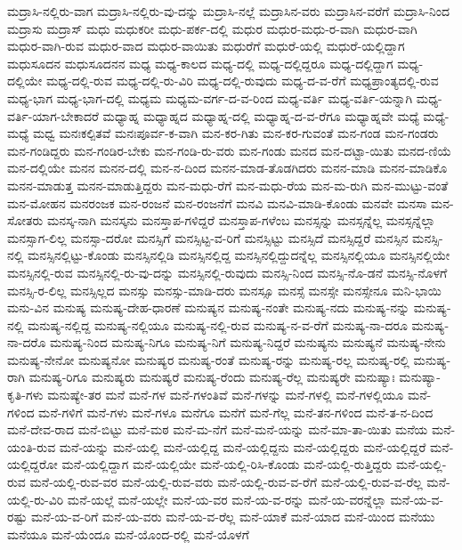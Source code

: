 {ಮದ್ರಾಸಿ-ನಲ್ಲಿರು-ವಾಗ
ಮದ್ರಾಸಿ-ನಲ್ಲಿರು-ವು-ದನ್ನು
ಮದ್ರಾಸಿ-ನಲ್ಲೆ
ಮದ್ರಾಸಿನ-ವರು
ಮದ್ರಾಸಿನ-ವರೆಗೆ
ಮದ್ರಾಸಿ-ನಿಂದ
ಮದ್ರಾಸು
ಮದ್ರಾಸ್
ಮಧು
ಮಧುಕರೀ
ಮಧು-ಪರ್ಕ-ದಲ್ಲಿ
ಮಧುರ
ಮಧುರ-ಮಧು-ರ-ವಾಗಿ
ಮಧುರ-ವಾಗಿ
ಮಧುರ-ವಾಗಿ-ರುವ
ಮಧುರ-ವಾದ
ಮಧುರ-ವಾಯಿತು
ಮಧುರೆಗೆ
ಮಧುರೆ-ಯಲ್ಲಿ
ಮಧುರೆ-ಯಲ್ಲಿದ್ದಾಗ
ಮಧುಸೂದನ
ಮಧುಸೂದನನ
ಮಧ್ಯ
ಮಧ್ಯ-ಕಾಲದ
ಮಧ್ಯ-ದಲ್ಲಿ
ಮಧ್ಯ-ದಲ್ಲಿದ್ದರೂ
ಮಧ್ಯ-ದಲ್ಲಿದ್ದಾಗ
ಮಧ್ಯ-ದಲ್ಲಿಯೇ
ಮಧ್ಯ-ದಲ್ಲಿ-ರುವ
ಮಧ್ಯ-ದಲ್ಲಿ-ರು-ವಿರಿ
ಮಧ್ಯ-ದಲ್ಲಿ-ರುವುದು
ಮಧ್ಯ-ದ-ವ-ರೆಗೆ
ಮಧ್ಯಪ್ರಾಂತ್ಯದಲ್ಲಿ-ರುವ
ಮಧ್ಯ-ಭಾಗ
ಮಧ್ಯ-ಭಾಗ-ದಲ್ಲಿ
ಮಧ್ಯಮ
ಮಧ್ಯಮ-ವರ್ಗ-ದ-ವ-ರಿಂದ
ಮಧ್ಯ-ವರ್ತಿ
ಮಧ್ಯ-ವರ್ತಿ-ಯನ್ನಾಗಿ
ಮಧ್ಯ-ವರ್ತಿ-ಯಾಗ-ಬೇಕಾದರೆ
ಮಧ್ಯಾಹ್ನ
ಮಧ್ಯಾಹ್ನದ
ಮಧ್ಯಾಹ್ನ-ದಲ್ಲಿ
ಮಧ್ಯಾಹ್ನ-ದ-ವ-ರೆಗೂ
ಮಧ್ಯಾಹ್ನವೇ
ಮಧ್ಯೆ
ಮಧ್ಯೆ-ಮಧ್ಯೆ
ಮಧ್ವ
ಮನಃಕಲ್ಪಿತವೆ
ಮನಃಪೂರ್ವ-ಕ-ವಾಗಿ
ಮನ-ಕರ-ಗಿತು
ಮನ-ಕರ-ಗುವಂತೆ
ಮನ-ಗಂಡ
ಮನ-ಗಂಡರು
ಮನ-ಗಂಡಿದ್ದರು
ಮನ-ಗಂಡಿರ-ಬೇಕು
ಮನ-ಗಂಡಿ-ರು-ವರು
ಮನ-ಗಂಡು
ಮನದ
ಮನ-ದಟ್ಟಾ-ಯಿತು
ಮನದ-ಣಿಯೆ
ಮನ-ದಲ್ಲಿಯೇ
ಮನನ
ಮನನ-ದಲ್ಲಿ
ಮನ-ನ-ದಿಂದ
ಮನನ-ಮಾಡ-ತೊಡಗಿದರು
ಮನನ-ಮಾಡಿ
ಮನನ-ಮಾಡಿಕೊ
ಮನನ-ಮಾಡುತ್ತ
ಮನನ-ಮಾಡುತ್ತಿದ್ದರು
ಮನ-ಮಧು-ರೆಗೆ
ಮನ-ಮಧು-ರೆಯ
ಮನ-ಮ-ರುಗಿ
ಮನ-ಮುಟ್ಟು-ವಂತೆ
ಮನ-ಮೋಹನ
ಮನರಂಜಕ
ಮನ-ರಂಜನೆ
ಮನ-ರಂಜನೆಗೆ
ಮನವಿ
ಮನವಿ-ಮಾಡಿ-ಕೊಂಡು
ಮನವೇ
ಮನಸಾ
ಮನ-ಸೋತರು
ಮನಸ್ಕ-ನಾಗಿ
ಮನಸ್ಕನು
ಮನಸ್ತಾಪ-ಗಳಿದ್ದರೆ
ಮನಸ್ತಾಪ-ಗಳೆಂಬ
ಮನಸ್ಸನ್ನು
ಮನಸ್ಸನ್ನೆಲ್ಲ
ಮನಸ್ಸನ್ನೆಲ್ಲಾ
ಮನಸ್ಸಾಗ-ಲಿಲ್ಲ
ಮನಸ್ಸಾ-ದರೋ
ಮನಸ್ಸಿಗೆ
ಮನಸ್ಸಿಟ್ಟ-ವ-ರಿಗೆ
ಮನಸ್ಸಿಟ್ಟು
ಮನಸ್ಸಿದೆ
ಮನಸ್ಸಿದ್ದರೆ
ಮನಸ್ಸಿನ
ಮನಸ್ಸಿ-ನಲ್ಲಿ
ಮನಸ್ಸಿನಲ್ಲಿಟ್ಟು-ಕೊಂಡು
ಮನಸ್ಸಿನಲ್ಲಿಡಿ
ಮನಸ್ಸಿನಲ್ಲಿದ್ದ
ಮನಸ್ಸಿನಲ್ಲಿದ್ದುದನ್ನೆಲ್ಲ
ಮನಸ್ಸಿನಲ್ಲಿಯೂ
ಮನಸ್ಸಿನಲ್ಲಿಯೇ
ಮನಸ್ಸಿನಲ್ಲಿ-ರುವ
ಮನಸ್ಸಿನಲ್ಲಿ-ರು-ವು-ದನ್ನು
ಮನಸ್ಸಿನಲ್ಲಿ-ರುವುದು
ಮನಸ್ಸಿ-ನಿಂದ
ಮನಸ್ಸಿ-ನೊ-ಡನೆ
ಮನಸ್ಸಿ-ನೊಳಗೆ
ಮನಸ್ಸಿ-ರ-ಲಿಲ್ಲ
ಮನಸ್ಸಿಲ್ಲದ
ಮನಸ್ಸು
ಮನಸ್ಸು-ಮಾಡಿ-ದರು
ಮನಸ್ಸೂ
ಮನಸ್ಸೆ
ಮನಸ್ಸೇ
ಮನಸ್ಸೇನೂ
ಮನಿ-ಭಾಯಿ
ಮನು-ವಿನ
ಮನುಷ್ಯ
ಮನುಷ್ಯ-ದೇಹ-ಧಾರಣೆ
ಮನುಷ್ಯನ
ಮನುಷ್ಯ-ನಂತೇ
ಮನುಷ್ಯ-ನದು
ಮನುಷ್ಯ-ನನ್ನು
ಮನುಷ್ಯ-ನಲ್ಲಿ
ಮನುಷ್ಯ-ನಲ್ಲಿದ್ದ
ಮನುಷ್ಯ-ನಲ್ಲಿಯೂ
ಮನುಷ್ಯ-ನಲ್ಲಿ-ರುವ
ಮನುಷ್ಯ-ನ-ವ-ರೆಗೆ
ಮನುಷ್ಯ-ನಾ-ದರೂ
ಮನುಷ್ಯ-ನಾ-ದರೊ
ಮನುಷ್ಯ-ನಿಂದ
ಮನುಷ್ಯ-ನಿಗೂ
ಮನುಷ್ಯ-ನಿಗೆ
ಮನುಷ್ಯ-ನಿದ್ದರೆ
ಮನುಷ್ಯನು
ಮನುಷ್ಯನೆ
ಮನುಷ್ಯ-ನೇನು
ಮನುಷ್ಯ-ನೇನೋ
ಮನುಷ್ಯನೋ
ಮನುಷ್ಯರ
ಮನುಷ್ಯ-ರಂತೆ
ಮನುಷ್ಯ-ರನ್ನು
ಮನುಷ್ಯ-ರಲ್ಲ
ಮನುಷ್ಯ-ರಲ್ಲಿ
ಮನುಷ್ಯ-ರಾಗಿ
ಮನುಷ್ಯ-ರಿಗೂ
ಮನುಷ್ಯರು
ಮನುಷ್ಯರೆ
ಮನುಷ್ಯ-ರೆಂದು
ಮನುಷ್ಯ-ರೆಲ್ಲ
ಮನುಷ್ಯರೇ
ಮನುಷ್ಯಾಃ
ಮನುಷ್ಯಾ-ಕೃತಿ-ಗಳು
ಮನುಷ್ಯೇ-ತರ
ಮನೆ
ಮನೆ-ಗಳ
ಮನೆ-ಗಳಂತಿವೆ
ಮನೆ-ಗಳನ್ನು
ಮನೆ-ಗಳಲ್ಲಿ
ಮನೆ-ಗಳಲ್ಲಿಯೂ
ಮನೆ-ಗಳಿಂದ
ಮನೆ-ಗಳಿಗೆ
ಮನೆ-ಗಳು
ಮನೆ-ಗಳೂ
ಮನೆಗೂ
ಮನೆಗೆ
ಮನೆ-ಗೆಲ್ಲ
ಮನೆ-ತನ-ಗಳಿಂದ
ಮನೆ-ತ-ನ-ದಿಂದ
ಮನೆ-ದೇವ-ರಾದ
ಮನೆ-ಬಿಟ್ಟು
ಮನೆ-ಮಠ
ಮನೆ-ಮ-ನೆಗೆ
ಮನೆ-ಮನೆ-ಯನ್ನು
ಮನೆ-ಮಾ-ತಾ-ಯಿತು
ಮನೆಯ
ಮನೆ-ಯಂತಿ-ರುವ
ಮನೆ-ಯನ್ನು
ಮನೆ-ಯಲ್ಲಿ
ಮನೆ-ಯಲ್ಲಿದ್ದ
ಮನೆ-ಯಲ್ಲಿದ್ದನು
ಮನೆ-ಯಲ್ಲಿದ್ದರು
ಮನೆ-ಯಲ್ಲಿದ್ದರೆ
ಮನೆ-ಯಲ್ಲಿದ್ದರೋ
ಮನೆ-ಯಲ್ಲಿದ್ದಾಗ
ಮನೆ-ಯಲ್ಲಿಯೇ
ಮನೆ-ಯಲ್ಲಿ-ರಿಸಿ-ಕೊಂಡು
ಮನೆ-ಯಲ್ಲಿ-ರುತ್ತಿದ್ದರು
ಮನೆ-ಯಲ್ಲಿ-ರುವ
ಮನೆ-ಯಲ್ಲಿ-ರುವ-ವರ
ಮನೆ-ಯಲ್ಲಿ-ರುವ-ವರು
ಮನೆ-ಯಲ್ಲಿ-ರುವ-ವ-ರೆಗೆ
ಮನೆ-ಯಲ್ಲಿ-ರುವ-ವ-ರೆಲ್ಲ
ಮನೆ-ಯಲ್ಲಿ-ರು-ವಿರಿ
ಮನೆ-ಯಲ್ಲೆ
ಮನೆ-ಯಲ್ಲೇ
ಮನೆ-ಯ-ವರ
ಮನೆ-ಯ-ವ-ರನ್ನು
ಮನೆ-ಯ-ವರನ್ನೆಲ್ಲಾ
ಮನೆ-ಯ-ವ-ರಷ್ಟು
ಮನೆ-ಯ-ವ-ರಿಗೆ
ಮನೆ-ಯ-ವರು
ಮನೆ-ಯ-ವ-ರೆಲ್ಲ
ಮನೆ-ಯಾಕೆ
ಮನೆ-ಯಾದ
ಮನೆ-ಯಿಂದ
ಮನೆಯು
ಮನೆಯೂ
ಮನೆ-ಯೆಂದೂ
ಮನೆ-ಯೊಂದ-ರಲ್ಲಿ
ಮನೆ-ಯೊಳಗೆ
}
